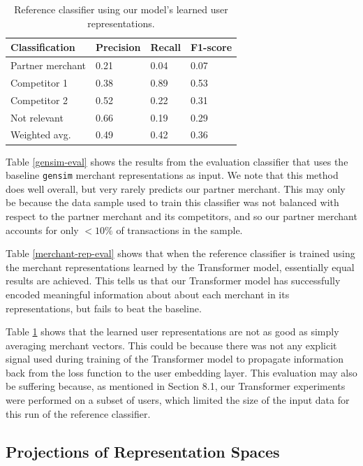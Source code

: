 \documentclass{article}
\begin{document}
\begin{table}
  \caption{Reference classifier using our model's learned user representations.}
  \label{user-rep-eval}
  \centering
  \begin{tabular}{l|lll}
    \toprule
    Classification &
    		Precision &
    		Recall &
         F1-score \\
    \midrule
    Partner merchant & 0.21 & 0.04 & 0.07 \\
    Competitor 1 & 0.38 & 0.89 & 0.53 \\
    Competitor 2 & 0.52 & 0.22 & 0.31 \\
    Not relevant & 0.66 & 0.19 & 0.29 \\
    \midrule
    Weighted avg. & 0.49 & 0.42 & 0.36 \\
    \bottomrule
  \end{tabular}
\end{table}

Table \ref{gensim-eval} shows the results from the evaluation classifier that uses the baseline \texttt{gensim} merchant representations as input. We note that this method does well overall, but very rarely predicts our partner merchant. This may only be because the data sample used to train this classifier was not balanced with respect to the partner merchant and its competitors, and so our partner merchant accounts for only $<10\%$ of transactions in the sample.

Table \ref{merchant-rep-eval} shows that when the reference classifier is trained using the merchant representations learned by the Transformer model, essentially equal results are achieved. This tells us that our Transformer model has successfully encoded meaningful information about about each merchant in its representations, but fails to beat the baseline.

Table \ref{user-rep-eval} shows that the learned user representations are not as good as simply averaging merchant vectors. This could be because there was not any explicit signal used during training of the Transformer model to propagate information back from the loss function to the user embedding layer. This evaluation may also be suffering because, as mentioned in Section 8.1, our Transformer experiments were performed on a subset of users, which limited the size of the input data for this run of the reference classifier.

\subsection{Projections of Representation Spaces}
\end{document}
